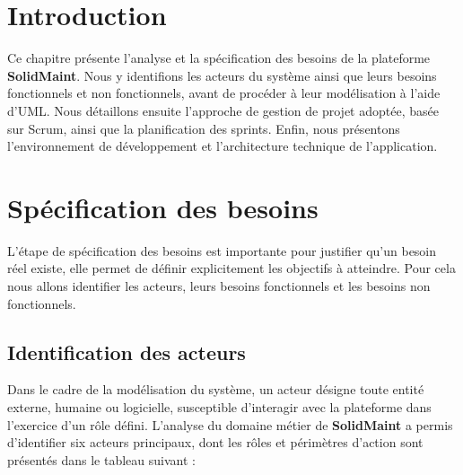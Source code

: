 ﻿\section*{Introduction}
Ce chapitre présente l’analyse et la spécification des besoins de la plateforme \textbf{SolidMaint}. 
Nous y identifions les acteurs du système ainsi que leurs besoins fonctionnels et non fonctionnels, avant de procéder à leur modélisation à l’aide d’UML. 
Nous détaillons ensuite l’approche de gestion de projet adoptée, basée sur Scrum, ainsi que la planification des sprints. 
Enfin, nous présentons l’environnement de développement et l’architecture technique de l’application.

\section{Spécification des besoins}
\label{sec:specification_besoins}
L'étape de spécification des besoins est importante pour justifier qu'un besoin réel existe, elle permet de définir explicitement les objectifs à atteindre.
\newline
Pour cela nous allons identifier les acteurs, leurs besoins fonctionnels et les
besoins non fonctionnels.

\subsection{Identification des acteurs}
Dans le cadre de la modélisation du système, un acteur désigne toute entité externe,
humaine ou logicielle, susceptible d'interagir avec la plateforme dans l'exercice
d'un rôle défini. L'analyse du domaine métier de \textbf{SolidMaint} a permis
d'identifier six acteurs principaux, dont les rôles et périmètres d'action sont
présentés dans le tableau suivant :

